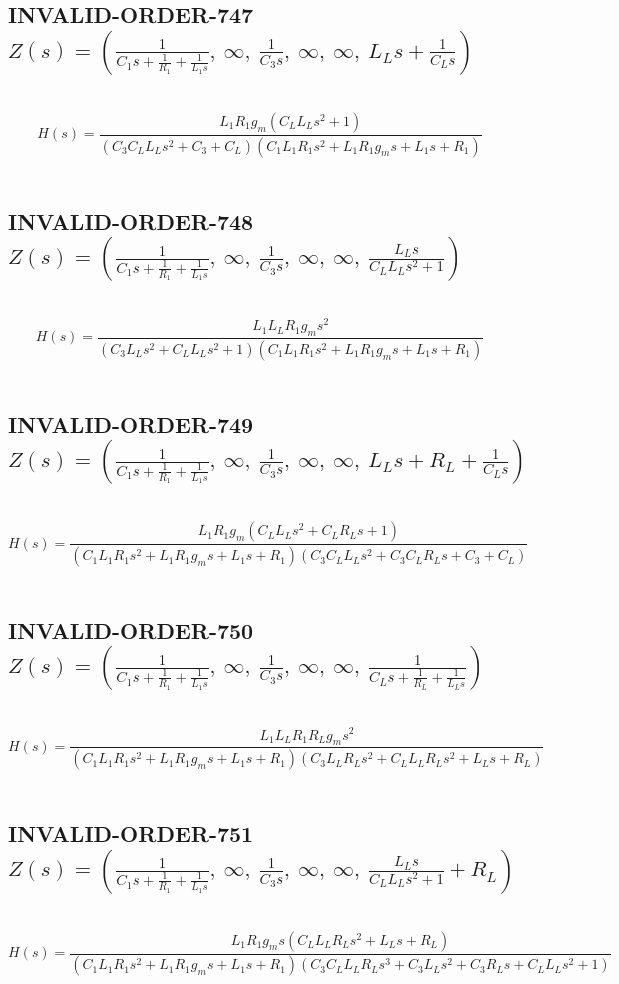 \documentclass{article}
\begin{document}
\subsection{INVALID-ORDER-747 $Z(s) = \left( \frac{1}{C_{1} s + \frac{1}{R_{1}} + \frac{1}{L_{1} s}}, \  \infty, \  \frac{1}{C_{3} s}, \  \infty, \  \infty, \  L_{L} s + \frac{1}{C_{L} s}\right)$ } \ 
\textbf{\[H(s) = \frac{L_{1} R_{1} g_{m} \left(C_{L} L_{L} s^{2} + 1\right)}{\left(C_{3} C_{L} L_{L} s^{2} + C_{3} + C_{L}\right) \left(C_{1} L_{1} R_{1} s^{2} + L_{1} R_{1} g_{m} s + L_{1} s + R_{1}\right)}\] } \ 
\subsection{INVALID-ORDER-748 $Z(s) = \left( \frac{1}{C_{1} s + \frac{1}{R_{1}} + \frac{1}{L_{1} s}}, \  \infty, \  \frac{1}{C_{3} s}, \  \infty, \  \infty, \  \frac{L_{L} s}{C_{L} L_{L} s^{2} + 1}\right)$ } \ 
\textbf{\[H(s) = \frac{L_{1} L_{L} R_{1} g_{m} s^{2}}{\left(C_{3} L_{L} s^{2} + C_{L} L_{L} s^{2} + 1\right) \left(C_{1} L_{1} R_{1} s^{2} + L_{1} R_{1} g_{m} s + L_{1} s + R_{1}\right)}\] } \ 
\subsection{INVALID-ORDER-749 $Z(s) = \left( \frac{1}{C_{1} s + \frac{1}{R_{1}} + \frac{1}{L_{1} s}}, \  \infty, \  \frac{1}{C_{3} s}, \  \infty, \  \infty, \  L_{L} s + R_{L} + \frac{1}{C_{L} s}\right)$ } \ 
\textbf{\[H(s) = \frac{L_{1} R_{1} g_{m} \left(C_{L} L_{L} s^{2} + C_{L} R_{L} s + 1\right)}{\left(C_{1} L_{1} R_{1} s^{2} + L_{1} R_{1} g_{m} s + L_{1} s + R_{1}\right) \left(C_{3} C_{L} L_{L} s^{2} + C_{3} C_{L} R_{L} s + C_{3} + C_{L}\right)}\] } \ 
\subsection{INVALID-ORDER-750 $Z(s) = \left( \frac{1}{C_{1} s + \frac{1}{R_{1}} + \frac{1}{L_{1} s}}, \  \infty, \  \frac{1}{C_{3} s}, \  \infty, \  \infty, \  \frac{1}{C_{L} s + \frac{1}{R_{L}} + \frac{1}{L_{L} s}}\right)$ } \ 
\textbf{\[H(s) = \frac{L_{1} L_{L} R_{1} R_{L} g_{m} s^{2}}{\left(C_{1} L_{1} R_{1} s^{2} + L_{1} R_{1} g_{m} s + L_{1} s + R_{1}\right) \left(C_{3} L_{L} R_{L} s^{2} + C_{L} L_{L} R_{L} s^{2} + L_{L} s + R_{L}\right)}\] } \ 
\subsection{INVALID-ORDER-751 $Z(s) = \left( \frac{1}{C_{1} s + \frac{1}{R_{1}} + \frac{1}{L_{1} s}}, \  \infty, \  \frac{1}{C_{3} s}, \  \infty, \  \infty, \  \frac{L_{L} s}{C_{L} L_{L} s^{2} + 1} + R_{L}\right)$ } \ 
\textbf{\[H(s) = \frac{L_{1} R_{1} g_{m} s \left(C_{L} L_{L} R_{L} s^{2} + L_{L} s + R_{L}\right)}{\left(C_{1} L_{1} R_{1} s^{2} + L_{1} R_{1} g_{m} s + L_{1} s + R_{1}\right) \left(C_{3} C_{L} L_{L} R_{L} s^{3} + C_{3} L_{L} s^{2} + C_{3} R_{L} s + C_{L} L_{L} s^{2} + 1\right)}\] } \ 
\end{document}
